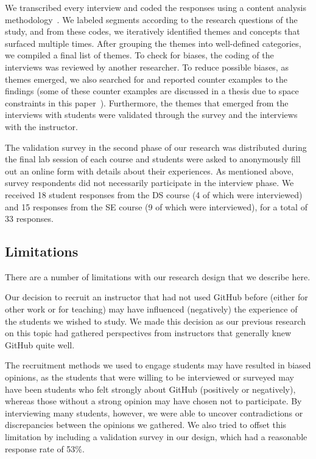 We transcribed every interview and coded the responses using a content analysis methodology~\cite{charmaz2006constructing}.
We labeled segments according to the research questions of the study, and from these codes, we iteratively identified themes and concepts that surfaced multiple times. After grouping the themes into well-defined categories, we compiled a final list of themes. To check for biases, the coding of the interviews was reviewed by another researcher. To reduce possible biases, as themes emerged, we also searched for and reported counter examples to the findings (some of these counter examples are discussed in a thesis due to space constraints in this paper~\cite{feliciano2015towards}). Furthermore, the themes that emerged from the interviews with students were validated through the survey and the interviews with the instructor.

The validation survey in the second phase of our research was distributed during the final lab session of each course and students were asked to anonymously fill out an online form with details about their experiences. As mentioned above, survey respondents did not necessarily participate in the interview phase. We received 18 student responses from the DS course (4 of which were interviewed) and 15 responses from the SE course (9 of which were interviewed), for a total of 33 responses.

\subsection{Limitations}
There are a number of limitations with our research design that we describe here.

Our decision to recruit an instructor that had not used GitHub before (either for other work or for teaching) may have influenced (negatively) the experience of the students we wished to study. We made this decision as our previous research on this topic had gathered perspectives from instructors that generally knew GitHub quite well.

The recruitment methods we used to engage students may have resulted in biased opinions, as the students that were willing to be interviewed or surveyed may have been students who felt strongly about GitHub (positively or negatively), whereas those without a strong opinion may have chosen not to participate. By interviewing many students, however, we were able to uncover contradictions or discrepancies between the opinions we gathered. We also tried to offset this limitation by including a validation survey in our design, which had a reasonable response rate of 53\%.

